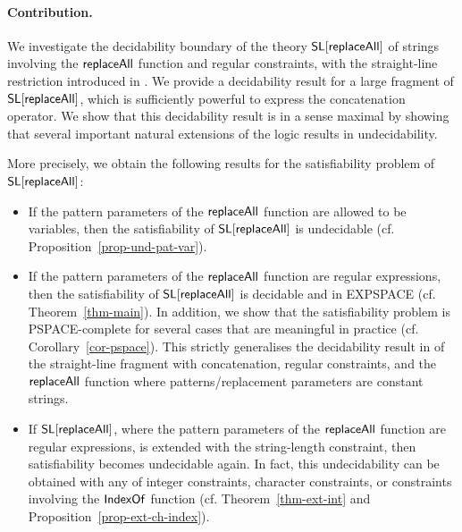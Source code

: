 \paragraph{Contribution.} We investigate the decidability boundary of the theory
$\mathsf{SL}[\mathsf{replaceAll}]$ of strings involving %
the $\mathsf{replaceAll}$ function and regular constraints, with the straight-line
restriction introduced in \cite{LB16}. We provide a decidability result for a 
large fragment of $\mathsf{SL}[\mathsf{replaceAll}]$, which is sufficiently powerful to
express the concatenation operator. We show that this decidability result is in a sense maximal
by showing that several important natural extensions of the logic results in undecidability.


More precisely,
we obtain the following results for the satisfiability problem of
$\mathsf{SL}[\mathsf{replaceAll}]$:
\begin{itemize}
\item If the pattern parameters of the $\mathsf{replaceAll}$ function are allowed to be variables, then the satisfiability of $\mathsf{SL}[\mathsf{replaceAll}]$ is undecidable (cf. Proposition~\ref{prop-und-pat-var}).
%
\item If the pattern parameters of the $\mathsf{replaceAll}$ function are regular
    expressions, then the satisfiability of $\mathsf{SL}[\mathsf{replaceAll}]$ is decidable
        and in EXPSPACE (cf. Theorem~\ref{thm-main}). In addition, we show that
        the satisfiability problem is PSPACE-complete for several cases that are
        meaningful in practice (cf. Corollary~\ref{cor-pspace}). This strictly
        generalises the decidability result in \cite{LB16} of the straight-line 
        fragment with concatenation, regular constraints, and the $\mathsf{replaceAll}$ 
        function where
        patterns/replacement parameters are constant strings.
%
\item If $\mathsf{SL}[\mathsf{replaceAll}]$, where the pattern parameters of the
    $\mathsf{replaceAll}$ function are regular expressions, is extended with the 
        string-length constraint, then satisfiability becomes undecidable
        again. In fact, this undecidability can be obtained with
        any of integer constraints, character constraints, or constraints 
        involving the $\mathsf{IndexOf}$ function
        (cf. Theorem~\ref{thm-ext-int} and 
        Proposition~\ref{prop-ext-ch-index}).
\end{itemize}

